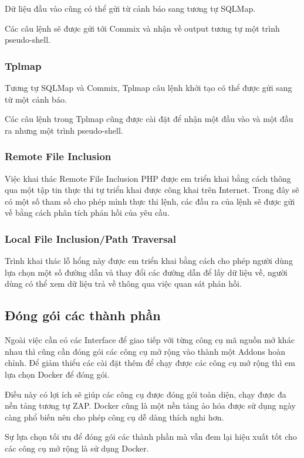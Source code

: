 \documentclass[./../main.tex]{subfiles}
\begin{document}
Dữ liệu đầu vào cũng có thể gửi từ cảnh báo sang tương tự SQLMap.

Các câu lệnh sẽ được gửi tới Commix và nhận về output tương tự một trình pseudo-shell.
\subsubsection{Tplmap}
Tương tự SQLMap và Commix, Tplmap  câu lệnh khởi tạo có thể được gửi sang từ một cảnh báo.

Các câu lệnh trong Tplmap cũng được cài đặt để nhận một đầu vào và một đầu ra nhưng một trình pseudo-shell.

\subsubsection{Remote File Inclusion}

Việc khai thác Remote File Inclusion PHP được em triển khai bằng cách thông qua một tập tin thực thi tự triển khai được công khai trên Internet. Trong đây sẽ có một số tham số cho phép mình thực thi lệnh, các đầu ra của lệnh sẽ được gửi về bằng cách phân tích phản hồi của yêu cầu.

\subsubsection{Local File Inclusion/Path Traversal}

Trình khai thác lỗ hổng này được em triển khai bằng cách cho phép người dùng lựa chọn một số đường dẫn và thay đổi các đường dẫn để lấy dữ liệu về, người dùng có thể xem dữ liệu trả về thông qua việc quan sát phản hồi.

\subsection{Đóng gói các thành phần}

Ngoài việc cần có các Interface để giao tiếp với từng công cụ mã nguồn mở khác nhau thì cũng cần đóng gói các công cụ mở rộng vào thành một Addons hoàn chỉnh. Để giảm thiểu các cài đặt thêm để chạy được các công cụ mở rộng thì em lựa chọn Docker để đóng gói.

Điều này có lợi ích sẽ giúp các công cụ được đóng gói toàn diện, chạy được đa nền tảng tương tự ZAP. Docker cũng là một nền tảng ảo hóa được sử dụng ngày càng phổ biến nên cho phép công cụ dễ dàng thích nghi hơn.

Sự lựa chọn tối ưu để đóng gói các thành phần mà vẫn đem lại hiệu xuất tốt cho các công cụ mở rộng là sử dụng Docker.
\end{document}
